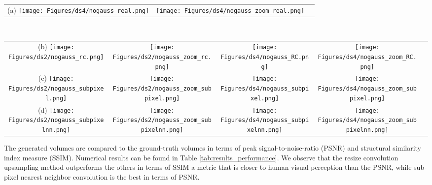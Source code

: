 \documentclass{article}
\begin{document}
\begin{figure*}
\begin{tabular}{ccc}
(a)
{\texttt{[image: Figures/ds4/nogauss\_real.png]}} &
{\texttt{[image: Figures/ds4/nogauss\_zoom\_real.png]}} \\
\end{tabular}
\\
\begin{tabular}{ccccc}
(b)
{\texttt{[image: Figures/ds2/nogauss\_rc.png]}} &
{\texttt{[image: Figures/ds2/nogauss\_zoom\_rc.png]}} &
{\texttt{[image: Figures/ds4/nogauss\_RC.png]}} &
{\texttt{[image: Figures/ds4/nogauss\_zoom\_RC.png]}}\\
(c)
{\texttt{[image: Figures/ds2/nogauss\_subpixel.png]}} &
{\texttt{[image: Figures/ds2/nogauss\_zoom\_subpixel.png]}} &
{\texttt{[image: Figures/ds4/nogauss\_subpixel.png]}} &
{\texttt{[image: Figures/ds4/nogauss\_zoom\_subpixel.png]}}\\

(d)
{\texttt{[image: Figures/ds2/nogauss\_subpixelnn.png]}} &
{\texttt{[image: Figures/ds2/nogauss\_zoom\_subpixelnn.png]}} &
{\texttt{[image: Figures/ds4/nogauss\_subpixelnn.png]}} &
{\texttt{[image: Figures/ds4/nogauss\_zoom\_subpixelnn.png]}}\\
\end{tabular}
\caption{Illustration of SR results (zoom-ins of the blue region) using downsampling factors 2 (left) and 4 (right). Original image (a), resize convolution (b), subpixel (c), subpixel-NN (d) upsampling}
\label{fig:comparison-visual}
\end{figure*}


 
The generated volumes are compared to the ground-truth volumes in terms of peak signal-to-noise-ratio (PSNR) and structural similarity index measure (SSIM). Numerical results can be found in Table \ref{tab:results_performance}. We observe that the resize convolution upsampling method outperforms the others in terms of SSIM a metric that is closer to human visual perception than the PSNR, while sub-pixel nearest neighbor convolution is the best in terms of PSNR. 
\end{document}
